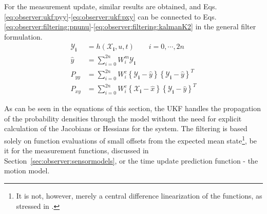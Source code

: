     For the measurement update, similar results are obtained, and Eqs.
    \eqref{eq:observer:ukf:pyy}-\eqref{eq:observer:ukf:pxy} can be connected to
    Eqs. \eqref{eq:observer:filtering:pnunu}-\eqref{eq:observer:filtering:kalmanK2}
    in the general filter formulation.
    \begin{align}
        \mathbf{\mathcal{Y}_{i}} &= h(\mathbf{\mathcal{X}_{i}}, u, t) \qquad i = 0,\cdots,2n \\
        \hat{y} &= \sum_{i=0}^{2n}W^{m}_{i}\mathbf{\mathcal{Y}_{i}} \\
        P_{yy} &= \sum_{i=0}^{2n}W^{c}_{i}
            \left\lbrace \mathbf{\mathcal{Y}_{i}} - \hat{y} \right\rbrace
            \left\lbrace \mathbf{\mathcal{Y}_{i}} - \hat{y} \right\rbrace^{T} \label{eq:observer:ukf:pyy} \\
        P_{xy} &= \sum_{i=0}^{2n}W^{c}_{i}
            \left\lbrace \mathbf{\mathcal{X}_{i}} - \hat{x} \right\rbrace
            \left\lbrace \mathbf{\mathcal{Y}_{i}} - \hat{y} \right\rbrace^{T} \label{eq:observer:ukf:pxy}
    \end{align}

    As can be seen in the equations of this section, the UKF handles the
    propagation of the probability densities through the model without
    the need for explicit calculation of the Jacobians or Hessians for the system.
    The filtering is based solely on function evaluations of small offsets from the
    expected mean state\footnote{It is not, however, merely a central difference linearization of the functions, as stressed in \citep{Julier95anewapproach}.},
    be it for the measurement functions, discussed in
    Section~\ref{sec:observer:sensormodels}, or the time update
    prediction function - the motion model.
